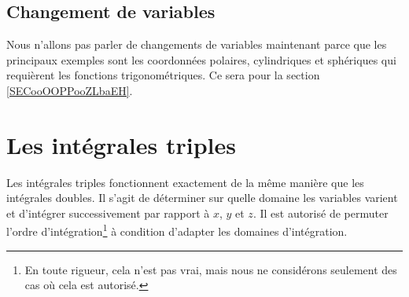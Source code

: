 \subsection{Changement de variables}

Nous n'allons pas parler de changements de variables maintenant parce que les principaux exemples sont les coordonnées polaires, cylindriques et sphériques qui requièrent les fonctions trigonométriques. Ce sera pour la section \ref{SECooOOPPooZLbaEH}.

\section{Les intégrales triples}

Les intégrales triples fonctionnent exactement de la même manière que les intégrales doubles. Il s'agit de déterminer sur quelle domaine les variables varient et d'intégrer successivement par rapport à $x$, $y$ et $z$. Il est autorisé de permuter l'ordre d'intégration\footnote{En toute rigueur, cela n'est pas vrai, mais nous ne considérons seulement des cas où cela est autorisé.} à condition d'adapter les domaines d'intégration.

